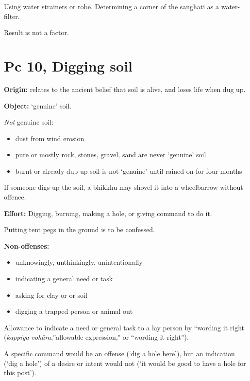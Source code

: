 Using water strainers or robe. Determining a corner of the sanghati as a
water-filter.

Result is not a factor.

\clearpage

\section{Pc 10, Digging soil}

\begin{multicols}{2}

\textbf{Origin:} relates to the ancient belief that soil is alive, and
loses life when dug up.

\textbf{Object:} `genuine' soil.

\emph{Not} genuine soil:

\begin{itemize}
\tightlist
\item
  dust from wind erosion
\item
  pure or mostly rock, stones, gravel, sand are never `genuine' soil
\item
  burnt or already dup up soil is not `genuine' until rained on for four
  months
\end{itemize}

If someone digs up the soil, a bhikkhu may shovel it into a wheelbarrow
without offence.

\textbf{Effort:} Digging, burning, making a hole, or giving command to
do it.

Putting tent pegs in the ground is to be confessed.

\columnbreak

\textbf{Non-offenses:}

\begin{itemize}
\tightlist
\item
  unknowingly, unthinkingly, unintentionally
\item
  indicating a general need or task
\item
  asking for clay or or soil
\item
  digging a trapped person or animal out
\end{itemize}

Allowance to indicate a need or general task to a lay person by
``wording it right (\emph{kappiya-vohāra},''allowable expression," or
``wording it right'').

A specific command would be an offense (`dig a hole here'), but an
indication (`dig a hole') of a desire or intent would not (`it would be
good to have a hole for this post').

\end{multicols}


